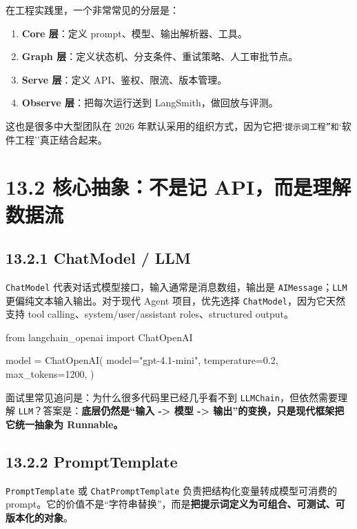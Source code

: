 在工程实践里，一个非常常见的分层是：


\begin{enumerate}[leftmargin=2em]
\item \textbf{Core 层}：定义 prompt、模型、输出解析器、工具。
\item \textbf{Graph 层}：定义状态机、分支条件、重试策略、人工审批节点。
\item \textbf{Serve 层}：定义 API、鉴权、限流、版本管理。
\item \textbf{Observe 层}：把每次运行送到 LangSmith，做回放与评测。
\end{enumerate}

这也是很多中大型团队在 2026 年默认采用的组织方式，因为它把`\texttt{提示词工程''和}`软件工程''真正结合起来。


\section{13.2 核心抽象：不是记 API，而是理解数据流}

\subsection{13.2.1 ChatModel / LLM}

\texttt{ChatModel} 代表对话式模型接口，输入通常是消息数组，输出是 \texttt{AIMessage}；\texttt{LLM} 更偏纯文本输入输出。对于现代 Agent 项目，优先选择 \texttt{ChatModel}，因为它天然支持 tool calling、system/user/assistant roles、structured output。


\begin{codeblock}
from langchain_openai import ChatOpenAI

model = ChatOpenAI(
    model="gpt-4.1-mini",
    temperature=0.2,
    max_tokens=1200,
)
\end{codeblock}

面试里常见追问是：为什么很多代码里已经几乎看不到 \texttt{LLMChain}，但依然需要理解 \texttt{LLM}？答案是：\textbf{底层仍然是``输入 -> 模型 -> 输出''的变换，只是现代框架把它统一抽象为 Runnable。}


\subsection{13.2.2 PromptTemplate}

\texttt{PromptTemplate} 或 \texttt{ChatPromptTemplate} 负责把结构化变量转成模型可消费的 prompt。它的价值不是``字符串替换''，而是\textbf{把提示词定义为可组合、可测试、可版本化的对象}。


